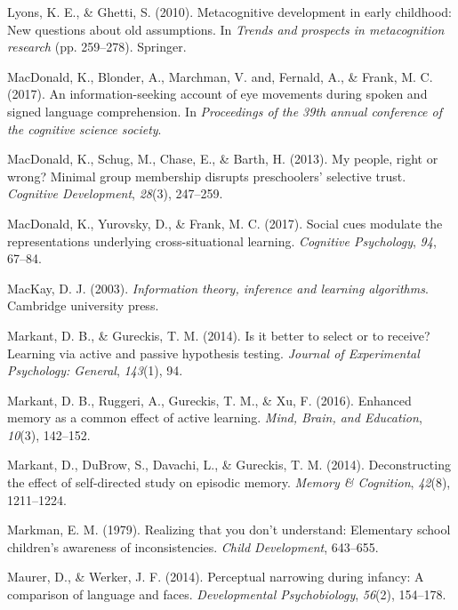 \documentclass[english,floatsintext,man]{apa6}
\theoremstyle{definition}
\theoremstyle{definition}
\theoremstyle{definition}
\theoremstyle{remark}
\begin{document}
\hypertarget{ref-lyons2010metacognitive}{}
Lyons, K. E., \& Ghetti, S. (2010). Metacognitive development in early
childhood: New questions about old assumptions. In \emph{Trends and
prospects in metacognition research} (pp. 259--278). Springer.

\hypertarget{ref-macdonald2017info}{}
MacDonald, K., Blonder, A., Marchman, V. and, Fernald, A., \& Frank, M.
C. (2017). An information-seeking account of eye movements during spoken
and signed language comprehension. In \emph{Proceedings of the 39th
annual conference of the cognitive science society}.

\hypertarget{ref-macdonald2013my}{}
MacDonald, K., Schug, M., Chase, E., \& Barth, H. (2013). My people,
right or wrong? Minimal group membership disrupts preschoolers'
selective trust. \emph{Cognitive Development}, \emph{28}(3), 247--259.

\hypertarget{ref-macdonald2017social}{}
MacDonald, K., Yurovsky, D., \& Frank, M. C. (2017). Social cues
modulate the representations underlying cross-situational learning.
\emph{Cognitive Psychology}, \emph{94}, 67--84.

\hypertarget{ref-mackay2003information}{}
MacKay, D. J. (2003). \emph{Information theory, inference and learning
algorithms}. Cambridge university press.

\hypertarget{ref-markant2014better}{}
Markant, D. B., \& Gureckis, T. M. (2014). Is it better to select or to
receive? Learning via active and passive hypothesis testing.
\emph{Journal of Experimental Psychology: General}, \emph{143}(1), 94.

\hypertarget{ref-markant2016enhanced}{}
Markant, D. B., Ruggeri, A., Gureckis, T. M., \& Xu, F. (2016). Enhanced
memory as a common effect of active learning. \emph{Mind, Brain, and
Education}, \emph{10}(3), 142--152.

\hypertarget{ref-markant2014deconstructing}{}
Markant, D., DuBrow, S., Davachi, L., \& Gureckis, T. M. (2014).
Deconstructing the effect of self-directed study on episodic memory.
\emph{Memory \& Cognition}, \emph{42}(8), 1211--1224.

\hypertarget{ref-markman1979realizing}{}
Markman, E. M. (1979). Realizing that you don't understand: Elementary
school children's awareness of inconsistencies. \emph{Child
Development}, 643--655.

\hypertarget{ref-maurer2014perceptual}{}
Maurer, D., \& Werker, J. F. (2014). Perceptual narrowing during
infancy: A comparison of language and faces. \emph{Developmental
Psychobiology}, \emph{56}(2), 154--178.
\end{document}
